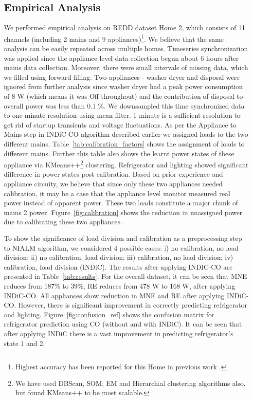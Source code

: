 \documentclass[conference]{IEEEtran}
\newcommand{\figref}[1]{Figure~\ref{#1}}
\newcommand{\tabref}[1]{Table~\ref{#1}}
\begin{document}
\subsection{Empirical Analysis}
\noindent We performed empirical analysis on REDD dataset Home 2, which consists of 11 channels (including 2 mains and 9 appliances)\footnote{Highest accuracy has been reported for this Home in previous work \cite{redd}.}. We believe that the same analysis can be easily repeated across multiple homes. Timeseries synchronization was applied since the appliance level data collection begun about 6 hours after mains data collection. Moreover, there were small intervals of missing data, which we filled using forward filling. Two appliances - washer dryer and disposal were ignored from further analysis since washer dryer had a peak power consumption of 8 W (which means it was Off throughout) and the contribution of disposal to overall power was less than 0.1 \%.  We downsampled this time synchronized data to one minute resolution using mean filter. 1 minute is a sufficient resolution to get rid of startup transients and voltage fluctuations. As per the Appliance to Mains step in INDiC-CO algorithm described earlier we assigned loads to the two different mains.  \tabref{tab:calibration_factors} shows the assignment of loads to different mains. Further this table also shows the learnt power states of these appliance via KMeans++\footnote{We have used DBScan, SOM, EM and Hierarchial clustering algorithms also, but found KMeans++ to be most scalable.} \cite{kmeansplusplus} clustering. Refrigerator and lighting showed significant difference in power states post calibration. Based on prior experience and appliance circuity\cite{ting2005}, we believe that since only these two appliances needed calibration, it may be a case that the appliance level monitor measured real power instead of apparent power. These two loads constitute a major chunk of mains 2 power. \figref{fig:calibration} shows the reduction in unassigned power due to calibrating these two appliances. 

\noindent To show the significance of load division and calibration as a preprocessing step to NIALM algorithm, we considered 4 possible cases:  i) no calibration, no load division; ii) no calibration, load division; iii) calibration, no load division; iv) calibration, load division (INDiC). The results after applying INDIC-CO are presented in \tabref{tab:results}. For the overall dataset, it can be seen that MNE reduces from 187\% to 39\%, RE reduces from 478 W to 168 W, after applying INDiC-CO. All appliances show reduction in MNE and RE after applying INDiC-CO. However, there is significant improvement in correctly predicting refrigerator and lighting. \figref{fig:confusion_ref} shows the confusion matrix for refrigerator prediction using CO (without and with INDiC). It can be seen that after applying INDiC there is a vast improvement in predicting refrigerator's state 1 and 2.
%
\end{document}
